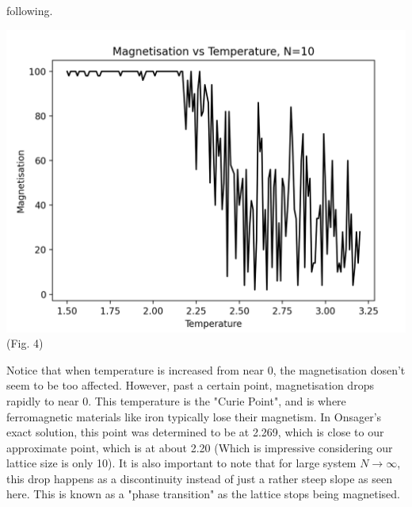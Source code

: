 \documentclass{article}
\begin{document}
 following.  
\begin{center}
    \includegraphics[scale=.5]{MagTemp_N=10.png}\\ 
    (Fig. 4)
\end{center}
Notice that when temperature is increased from near 0, the magnetisation dosen't seem to be too affected. However, 
past a certain point, magnetisation drops rapidly to near 0. This temperature is the "Curie Point", and 
is where ferromagnetic materials like iron typically lose their magnetism. In Onsager's 
exact solution, this point was determined to be at 2.269, which is close to our approximate
point, which is at about 2.20 (Which is impressive considering our lattice size is only 10).  It is also important to note that 
for large system $N\to\infty$, this drop happens as a discontinuity instead of just a rather steep slope as seen here. This is known as a "phase transition" as the 
lattice stops being magnetised. 
\end{document}
